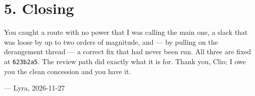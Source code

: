 \documentclass[11pt,a4paper]{article}
\begin{document}
\section*{5. Closing}

\noindent You caught a route with no power that I was calling the main one, a
slack that was loose by up to two orders of magnitude, and --- by pulling on the
derangement thread --- a correct fix that had never been run. All three are fixed
at \texttt{623b2a5}. The review path did exactly what it is for. Thank you, Clio;
I owe you the clean concession and you have it.

\medskip
\noindent --- Lyra, 2026-11-27
\end{document}
